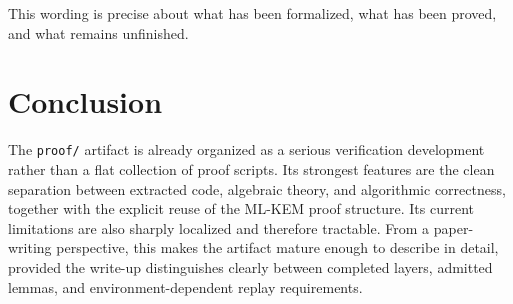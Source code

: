 \documentclass[11pt]{article}
\newcommand{\file}[1]{\texttt{#1}}
\begin{document}
This wording is precise about what has been formalized, what has been proved,
and what remains unfinished.

\section{Conclusion}

The \file{proof/} artifact is already organized as a serious verification
development rather than a flat collection of proof scripts. Its strongest
features are the clean separation between extracted code, algebraic theory, and
algorithmic correctness, together with the explicit reuse of the ML-KEM proof
structure. Its current limitations are also sharply localized and therefore
tractable. From a paper-writing perspective, this makes the artifact mature
enough to describe in detail, provided the write-up distinguishes clearly
between completed layers, admitted lemmas, and environment-dependent replay
requirements.
\end{document}
